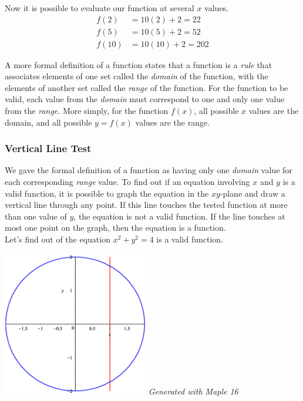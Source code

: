 \documentclass[oneside]{article}
\begin{document}
Now it is possible to evaluate our function at several $x$ values. 
\begin{align*}
	f(2) & = 10(2) + 2 = 22 \\
	f(5) & = 10(5) + 2 = 52 \\
	f(10) & = 10(10) + 2 = 202
\end{align*}

A more formal definition of a function states that a function is a \textit{rule} that associates elements of one set called the \textit{domain} of the function, with the elements of another set called the \textit{range} of the function. For the function to be valid, each value from the \textit{domain} must correspond to one and only one value from the \textit{range}. More simply, for the function $f(x)$, all possible $x$ values are the domain, and all possible $y = f(x)$ values are the range.

\subsubsection{Vertical Line Test}
We gave the formal definition of a function as having only one \textit{domain} value for each corresponding \textit{range} value. To find out if an equation involving $x$ and $y$ is a valid function, it is possible to graph the equation in the $xy$-plane and draw a vertical line through any point. If this line touches the tested function at more than one value of $y$, the equation is not a valid function. If the line touches at most one point on the graph, then the equation is a function. \\

Let's find out of the equation $x^2 + y^2 = 4$ is a valid function. 

\begin{center}
\includegraphics[width=2.5in, height=2.5in]{img/vert_line_test.eps}
\small \textit{Generated with Maple 16} \\
\end{center}
\end{document}
